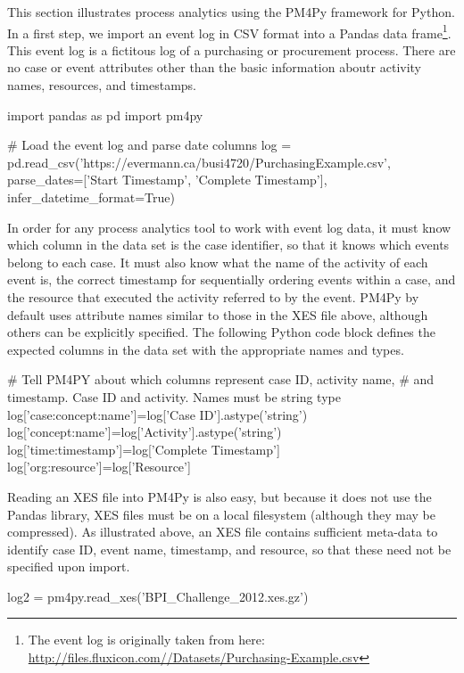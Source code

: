 \begin{withcode}
This section illustrates process analytics using the PM4Py framework for Python. In a first step, we import an event log in CSV format into a Pandas data frame\footnote{The event log is originally taken from here: \url{http://files.fluxicon.com//Datasets/Purchasing-Example.csv}}. This event log is a fictitous log of a purchasing or procurement process. There are no case or event attributes other than the basic information aboutr activity names, resources, and timestamps.

\begin{pythoncode}
import pandas as pd
import pm4py

# Load the event log and parse date columns
log = pd.read_csv('https://evermann.ca/busi4720/PurchasingExample.csv', 
   parse_dates=['Start Timestamp', 'Complete Timestamp'], 
   infer_datetime_format=True)
\end{pythoncode}

In order for any process analytics tool to work with event log data, it must know which column in the data set is the case identifier, so that it knows which events belong to each case. It must also know what the name of the activity of each event is, the correct timestamp for sequentially ordering events within a case, and the resource that executed the activity referred to by the event. PM4Py by default uses attribute names similar to those in the XES file above, although others can be explicitly specified. The following Python code block defines the expected columns in the data set with the appropriate names and types.

\begin{pythoncode}
# Tell PM4PY about which columns represent case ID, activity name, 
# and timestamp. Case ID and activity. Names must be string type
log['case:concept:name']=log['Case ID'].astype('string')
log['concept:name']=log['Activity'].astype('string')
log['time:timestamp']=log['Complete Timestamp']
log['org:resource']=log['Resource']
\end{pythoncode}

Reading an XES file into PM4Py is also easy, but because it does not use the Pandas library, XES files must be on a local filesystem (although they may be compressed). As illustrated above, an XES file contains sufficient meta-data to identify case ID, event name, timestamp, and resource, so that these need not be specified upon import.

\begin{pythoncode}
log2 = pm4py.read_xes('BPI_Challenge_2012.xes.gz')
\end{pythoncode}


\end{withcode}
